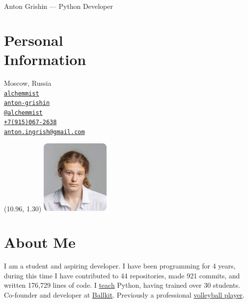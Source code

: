 \documentclass[margin,line]{resume}
\begin{document}
{\vspace*{-13mm}\sc \large Anton Grishin — Python Developer} \\
\begin{resume}
  \begin{minipage}[t]{0.55\textwidth}
    \section{\mysidestyle Personal\\Information}
    Moscow, Russia \\
    \faGithub  \space
    \href{https://github.com/alchemmist/}{\texttt{alchemmist}} \\
    \faLinkedin \space
    \href{https://www.linkedin.com/in/anton-grishin-6966a8362/}{\texttt{anton-grishin}}
    \\
    \faPaperPlane \space \href{https://t.me/alchemmist}{\texttt{@alchemmist}} \\
    \faPhone \space
    \href{tel:+1234567890}{\color{blue}\texttt{+7(915)067-2638}}  \\
    \faEnvelope \space
    \href{mailto:anton.ingrish@gmail.com}{\color{blue}\texttt{anton.ingrish@gmail.com}}
  \end{minipage}

  \begin{minipage}[H]{0.18\textwidth}
    \begin{textblock}{7}(10.96, 1.30)
      \includegraphics[width=0.255\textwidth]{../images/avatar.png}
    \end{textblock}
  \end{minipage}

  \vspace{-7mm}
  \section{\mysidestyle About Me}
  I am a student and aspiring developer. I have been programming for 4 years, during this time I have contributed to 44 repositories, made 921 commits, and written 176,729 lines of code.
  I \href{https://www.avito.ru/moskva/predlozheniya_uslug/prepodavatel_programmirovaniya_na_python_2556461612}{teach}
  Python, having trained over 30 students. Co-founder and developer at \href{https://ballkit.ru/}{Ballkit}. Previously a professional \href{https://alchemmist.github.io/CV/attachments/sport.pdf}{volleyball player}.


\end{resume}
\end{document}
